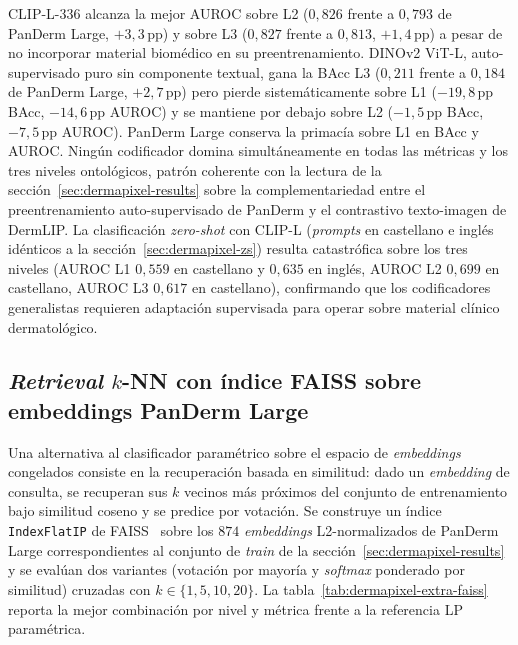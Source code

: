 CLIP-L-336 alcanza la mejor AUROC sobre L2 ($0{,}826$ frente a
$0{,}793$ de PanDerm Large, $+3{,}3$\,pp) y sobre L3
($0{,}827$ frente a $0{,}813$, $+1{,}4$\,pp) a pesar de no
incorporar material biomédico en su preentrenamiento. DINOv2 ViT-L,
auto-supervisado puro sin componente textual, gana la BAcc L3
($0{,}211$ frente a $0{,}184$ de PanDerm Large,
$+2{,}7$\,pp) pero pierde sistemáticamente sobre L1
($-19{,}8$\,pp BAcc, $-14{,}6$\,pp AUROC) y se mantiene por
debajo sobre L2 ($-1{,}5$\,pp BAcc, $-7{,}5$\,pp AUROC).
PanDerm Large conserva la primacía sobre L1 en BAcc y AUROC.
Ningún codificador domina simultáneamente en todas las métricas y
los tres niveles ontológicos, patrón coherente con la lectura de la
secci\'on~\ref{sec:dermapixel-results} sobre la complementariedad
entre el preentrenamiento auto-supervisado de PanDerm y el
contrastivo texto-imagen de DermLIP. La clasificación
\emph{zero-shot} con CLIP-L (\emph{prompts} en castellano e
inglés idénticos a la secci\'on~\ref{sec:dermapixel-zs}) resulta
catastrófica sobre los tres niveles (AUROC L1 $0{,}559$ en
castellano y $0{,}635$ en inglés, AUROC L2 $0{,}699$ en
castellano, AUROC L3 $0{,}617$ en castellano), confirmando que los
codificadores generalistas requieren adaptación supervisada para
operar sobre material clínico dermatológico.

\subsection*{\emph{Retrieval} $k$-NN con índice FAISS sobre
embeddings PanDerm Large}
\label{sec:dermapixel-extra-faiss}

Una alternativa al clasificador paramétrico sobre el espacio de
\emph{embeddings} congelados consiste en la recuperación basada en
similitud: dado un \emph{embedding} de consulta, se recuperan sus
$k$ vecinos más próximos del conjunto de entrenamiento bajo
similitud coseno y se predice por votación. Se construye un índice
\texttt{IndexFlatIP} de FAISS~\cite{faiss2019} sobre los
$874$ \emph{embeddings} L2-normalizados de PanDerm Large
correspondientes al conjunto de \emph{train} de la
secci\'on~\ref{sec:dermapixel-results} y se evalúan dos variantes
(votación por mayoría y \emph{softmax} ponderado por
similitud) cruzadas con $k \in \{1, 5, 10, 20\}$. La
tabla~\ref{tab:dermapixel-extra-faiss} reporta la mejor combinación
por nivel y métrica frente a la referencia LP paramétrica.

